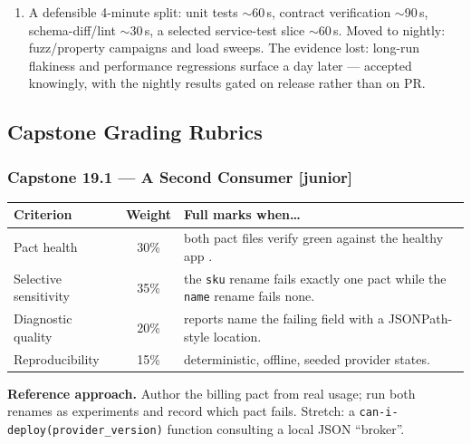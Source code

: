 \begin{enumerate}[label=\textbf{E-\arabic*.}, leftmargin=2.6em]
    staging environment remain within baseline bands under the latency-fault
    injection. Abort criteria: error budget burn $>$2$\times$, p99 beyond
    the band, or any page. Telemetry proving the experiment stayed in
    bounds: canary-cohort vs control metrics plus blast-radius scoping
    labels on every injected fault.
  \item A defensible 4-minute split: unit tests $\sim$60\,s, contract
    verification $\sim$90\,s, schema-diff/lint $\sim$30\,s, a selected
    service-test slice $\sim$60\,s. Moved to nightly: fuzz/property
    campaigns and load sweeps. The evidence lost: long-run flakiness and
    performance regressions surface a day later --- accepted knowingly,
    with the nightly results gated on release rather than on PR.
\end{enumerate}

\subsection{Capstone Grading Rubrics}

\subsubsection*{Capstone 19.1 --- A Second Consumer [junior]}
\begin{center}\small
\begin{tabularx}{\textwidth}{l c X}
\toprule
\textbf{Criterion} & \textbf{Weight} & \textbf{Full marks when\ldots} \\
\midrule
Pact health & 30\% & both pact files verify green against the healthy app \cite{pactdocs}. \\
Selective sensitivity & 35\% & the \texttt{sku} rename fails exactly one pact while the \texttt{name} rename fails none. \\
Diagnostic quality & 20\% & reports name the failing field with a JSONPath-style location. \\
Reproducibility & 15\% & deterministic, offline, seeded provider states. \\
\bottomrule
\end{tabularx}
\end{center}
\textbf{Reference approach.} Author the billing pact from real usage; run
both renames as experiments and record which pact fails. Stretch: a
\texttt{can-i-deploy(provider\_version)} function consulting a local JSON
``broker''.

